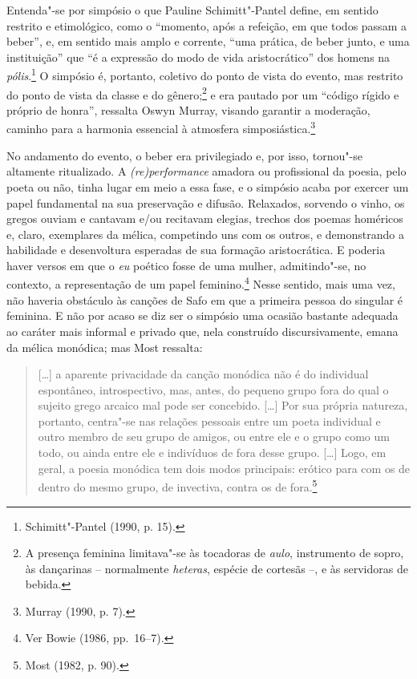 Entenda"-se por simpósio o que Pauline Schimitt"-Pantel define, em
sentido restrito e etimológico, como o “momento, após a refeição, em que todos
passam a beber”, e, em sentido mais amplo e corrente, “uma prática, de beber
junto, e uma instituição” que “é a expressão do modo de vida aristocrático” dos
homens na \textit{pólis}.\footnote{ Schimitt"-Pantel (1990, p. 15).} O simpósio
é, portanto, coletivo do ponto de vista do
evento, mas restrito do ponto de vista da classe e do gênero;\footnote{A presença
feminina limitava"-se às tocadoras de \textit{aulo}, instrumento de sopro, às
dançarinas -- normalmente \textit{heteras}, espécie de cortesãs --, e às servidoras de bebida.} e era pautado por um
“código rígido e próprio de honra”, ressalta Oswyn Murray, visando
garantir a moderação, caminho para a harmonia essencial à atmosfera
simposiástica.\footnote{ Murray (1990, p. 7).}

No andamento do evento, o beber era privilegiado e, por isso, tornou"-se
altamente ritualizado. A \textit{(re)performance} amadora ou profissional da
poesia, pelo poeta ou não, tinha lugar em meio a essa fase, e o simpósio acaba
por exercer um papel fundamental na sua preservação e difusão. Relaxados,
sorvendo o vinho, os gregos ouviam e cantavam e/ou recitavam elegias, trechos
dos poemas homéricos e, claro, exemplares da mélica, competindo uns com os
outros, e demonstrando a habilidade e desenvoltura esperadas de sua formação
aristocrática. E poderia haver
versos em que o \textit{eu} poético fosse de uma mulher, admitindo"-se, no contexto, a
representação de um papel feminino.\footnote{ Ver Bowie (1986, pp.~16--7).}
Nesse sentido, mais uma vez, não haveria obstáculo às canções de Safo em que a primeira pessoa do singular é feminina. E não por acaso se diz ser o simpósio uma
ocasião bastante adequada ao caráter mais informal e privado que, nela construído discursivamente, emana da mélica monódica; mas Most ressalta:

\begin{quote}
\mbox[\ldots{}] a aparente privacidade da canção monódica não é do individual espontâneo,
introspectivo, mas, antes, do pequeno grupo fora do qual o sujeito grego
arcaico mal pode ser concebido. [\ldots{}] Por sua própria natureza, portanto,
centra"-se nas relações pessoais entre um poeta individual e outro membro de seu
grupo de amigos, ou entre ele e o grupo como um todo, ou ainda entre ele e
indivíduos de fora desse grupo. [\ldots{}] Logo, em geral, a poesia monódica tem
dois modos principais: erótico para com os de dentro do mesmo grupo, de
invectiva, contra os de fora.\footnote{ Most (1982, p. 90).}
\end{quote}


